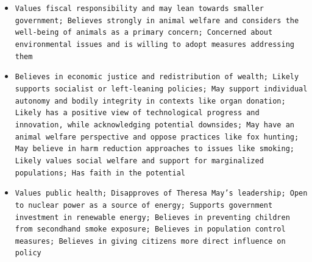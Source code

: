 \documentclass[11pt]{article}
\begin{document}
\begin{itemize}
\item \texttt{Values fiscal responsibility and may lean towards smaller government; Believes strongly in animal welfare and considers the well-being of animals as a primary concern; Concerned about environmental issues and is willing to adopt measures addressing them}
\item \texttt{Believes in economic justice and redistribution of wealth; Likely supports socialist or left-leaning policies; May support individual autonomy and bodily integrity in contexts like organ donation; Likely has a positive view of technological progress and innovation, while acknowledging potential downsides; May have an animal welfare perspective and oppose practices like fox hunting; May believe in harm reduction approaches to issues like smoking; Likely values social welfare and support for marginalized populations; Has faith in the potential}
\item \texttt{Values public health; Disapproves of Theresa May's leadership; Open to nuclear power as a source of energy; Supports government investment in renewable energy; Believes in preventing children from secondhand smoke exposure; Believes in population control measures; Believes in giving citizens more direct influence on policy}
\end{itemize}
\end{document}
